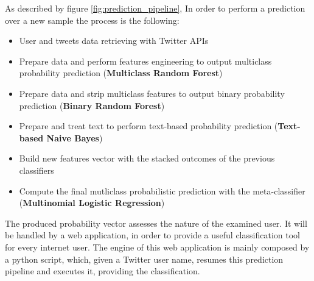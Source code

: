As described by figure \ref{fig:prediction_pipeline}, In order to perform a prediction over a new sample the process is the following:
\begin{itemize}
	\item[\PencilRight]User and tweets data retrieving with Twitter APIs
	\item[\PencilRight]Prepare data and perform features engineering to output multiclass probability prediction (\textbf{Multiclass Random Forest})
	\item[\PencilRight]Prepare data and strip multiclass features to output binary probability prediction (\textbf{Binary Random Forest})
	\item[\PencilRight]Prepare and treat text to perform text-based probability prediction (\textbf{Text-based Naive Bayes})
	\item[\PencilRight]Build new features vector with the stacked outcomes of the previous classifiers
	\item[\PencilRight]Compute the final mutliclass probabilistic prediction with the meta-classifier (\textbf{Multinomial Logistic Regression})
\end{itemize}
The produced probability vector assesses the nature of the examined user.
It will be handled by a web application, in order to provide a useful classification tool for every internet user.
The engine of this web application is mainly composed by a python script, which, given a Twitter user name, resumes this prediction pipeline and executes it, providing the classification.

